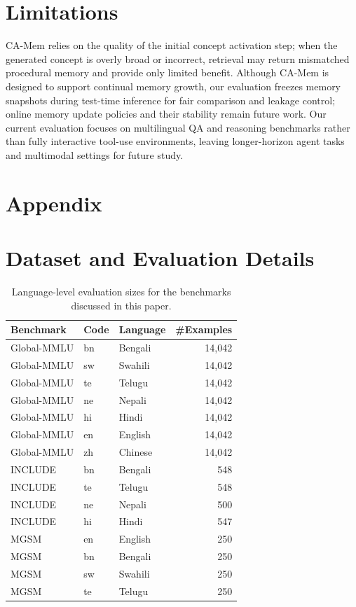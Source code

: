\documentclass[11pt]{article}
\newcommand{\FloatBarrier}{}
\begin{document}
\section*{Limitations}

CA-Mem relies on the quality of the initial concept activation step; when the generated concept is overly broad or incorrect, retrieval may return mismatched procedural memory and provide only limited benefit.
Although CA-Mem is designed to support continual memory growth, our evaluation freezes memory snapshots during test-time inference for fair comparison and leakage control; online memory update policies and their stability remain future work.
Our current evaluation focuses on multilingual QA and reasoning benchmarks rather than fully interactive tool-use environments, leaving longer-horizon agent tasks and multimodal settings for future study.


%


\clearpage
\appendix
\section*{Appendix}
\raggedbottom

\section{Dataset and Evaluation Details}
\label{sec:app_dataset}

\begin{table}[H]
\centering
\scriptsize
\setlength{\tabcolsep}{4pt}
\begin{tabular}{l l l r}
\hline
Benchmark & Code & Language & \#Examples \\
\hline
Global-MMLU & bn & Bengali & 14,042 \\
Global-MMLU & sw & Swahili & 14,042 \\
Global-MMLU & te & Telugu & 14,042 \\
Global-MMLU & ne & Nepali & 14,042 \\
Global-MMLU & hi & Hindi & 14,042 \\
Global-MMLU & en & English & 14,042 \\
Global-MMLU & zh & Chinese & 14,042 \\
\hline
INCLUDE & bn & Bengali & 548 \\
INCLUDE & te & Telugu & 548 \\
INCLUDE & ne & Nepali & 500 \\
INCLUDE & hi & Hindi & 547 \\
\hline
MGSM & en & English & 250 \\
MGSM & bn & Bengali & 250 \\
MGSM & sw & Swahili & 250 \\
MGSM & te & Telugu & 250 \\
\hline
\end{tabular}
\caption{Language-level evaluation sizes for the benchmarks discussed in this paper.}
\label{tab:dataset_language_counts}
\end{table}
\FloatBarrier
\end{document}
